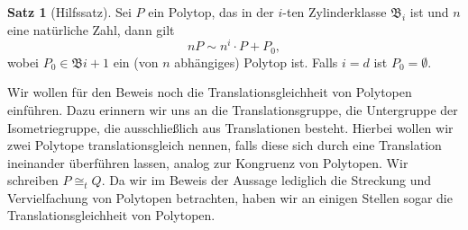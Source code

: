 \documentclass[11pt,titlepage]{article}
\theoremstyle{definition}
\newtheorem{theorem}{Satz}[section]
\theoremstyle{remark}
\begin{document}
	\begin{theorem}[Hilfssatz]\label{thm:hilfssatz}
		Sei $P$ ein Polytop, das in der $i$-ten Zylinderklasse $\mathfrak{B}_i$ ist 
		und $n$ eine natürliche Zahl, dann gilt
		\[nP\sim n^i\cdot P+P_0,\]
		wobei $P_0\in\mathfrak{B}{i+1}$ ein (von $n$ abhängiges) Polytop ist. 
		Falls $i=d$ ist $P_0=\emptyset$.
	\end{theorem}
	
	Wir wollen für den Beweis noch die Translationsgleichheit von Polytopen 
	einführen. Dazu erinnern wir uns an die Translationsgruppe, die 
	Untergruppe der Isometriegruppe, die ausschließlich aus Translationen besteht. 
	Hierbei wollen wir zwei Polytope translationsgleich nennen, falls 
	diese sich durch eine Translation ineinander überführen lassen, analog zur 
	Kongruenz von Polytopen. Wir schreiben $P\cong_t Q$. Da wir im 
	Beweis der Aussage lediglich die Streckung und Vervielfachung von Polytopen 
	betrachten, haben wir an einigen Stellen sogar die Translationsgleichheit 
	von Polytopen.
	
\end{document}
